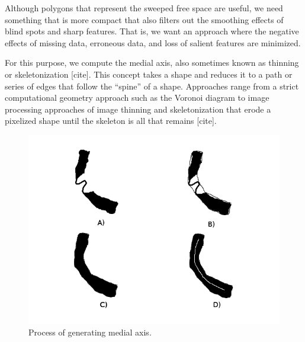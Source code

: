 Although polygons that represent the sweeped free space are useful, we need something that is more compact that also filters out the smoothing effects of blind spots and sharp features. That is, we want an approach where the negative effects of missing data, erroneous data, and loss of salient features are minimized.

For this purpose, we compute the medial axis, also sometimes known as thinning or skeletonization [cite]. This concept takes a shape and reduces it to a path or series of edges that follow the ``spine'' of a shape. Approaches range from a strict computational geometry approach such as the Voronoi diagram to image processing approaches of image thinning and skeletonization that erode a pixelized shape until the skeleton is all that remains [cite].


%


\begin{figure}[htbp]
\centering
\includegraphics[keepaspectratio,width=400pt,height=0.75\textheight]{4_medial_process.png}
\caption{Process of generating medial axis.}
\label{medial1}
\end{figure}



